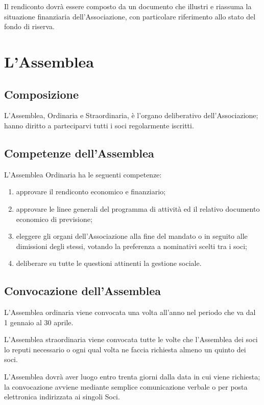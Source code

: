 \documentclass[a4paper,11pt,oneside]{article}
\begin{document}
Il rendiconto dovrà essere composto da un documento che illustri e riassuma la situazione finanziaria dell'Associazione, con particolare riferimento allo stato del fondo di riserva.

\section{L'Assemblea}

\subsection{Composizione}
L'Assemblea, Ordinaria e Straordinaria, è l'organo deliberativo dell'Associazione; hanno diritto a parteciparvi tutti i soci regolarmente iscritti.

\subsection{Competenze dell'Assemblea}
L'Assemblea Ordinaria ha le seguenti competenze:

\begin{enumerate}
 \item  approvare il rendiconto economico e finanziario; 
 \item  approvare le linee generali del programma di attività ed il relativo documento economico di previsione; 
 \item  eleggere gli organi dell'Associazione alla fine del mandato o in seguito alle dimissioni degli stessi, votando la preferenza a nominativi scelti tra i soci;
 \item  deliberare su tutte le questioni attinenti la gestione sociale.
\end{enumerate}

\subsection{Convocazione dell'Assemblea}
L'Assemblea ordinaria viene convocata una volta all'anno nel periodo che va dal 1 gennaio al 30 aprile. 

L'Assemblea straordinaria viene convocata tutte le volte che l'Assemblea dei soci lo reputi necessario o ogni qual volta ne faccia richiesta almeno un quinto dei soci.

L'Assemblea dovrà aver luogo entro trenta giorni dalla data in cui viene richiesta; la convocazione avviene mediante semplice comunicazione verbale o per posta elettronica indirizzata ai singoli Soci.
\end{document}
